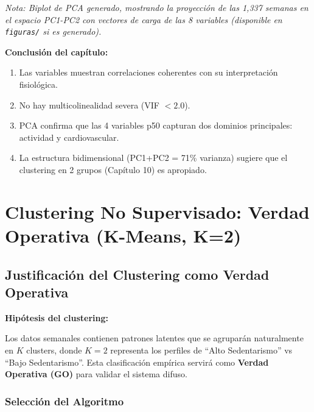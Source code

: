 \documentclass[12pt,letterpaper,twoside]{report}
\begin{document}
\textit{Nota: Biplot de PCA generado, mostrando la proyección de las 1,337 semanas en el espacio PC1-PC2 con vectores de carga de las 8 variables (disponible en \texttt{figuras/} si es generado).}

\begin{conclusionbox}
\textbf{Conclusión del capítulo:}

\begin{enumerate}[noitemsep]
    \item Las variables muestran correlaciones coherentes con su interpretación fisiológica.
    \item No hay multicolinealidad severa (VIF $< 2.0$).
    \item PCA confirma que las 4 variables p50 capturan dos dominios principales: actividad y cardiovascular.
    \item La estructura bidimensional (PC1+PC2 = 71\% varianza) sugiere que el clustering en 2 grupos (Capítulo 10) es apropiado.
\end{enumerate}
\end{conclusionbox}

\chapter{Clustering No Supervisado: Verdad Operativa (K-Means, K=2)}

\section{Justificación del Clustering como Verdad Operativa}

\begin{hipotesisbox}
\textbf{Hipótesis del clustering:}

Los datos semanales contienen patrones latentes que se agruparán naturalmente en $K$ clusters, donde $K=2$ representa los perfiles de ``Alto Sedentarismo'' vs ``Bajo Sedentarismo''. Esta clasificación empírica servirá como \textbf{Verdad Operativa (GO)} para validar el sistema difuso.
\end{hipotesisbox}

\subsection{Selección del Algoritmo}
\end{document}
